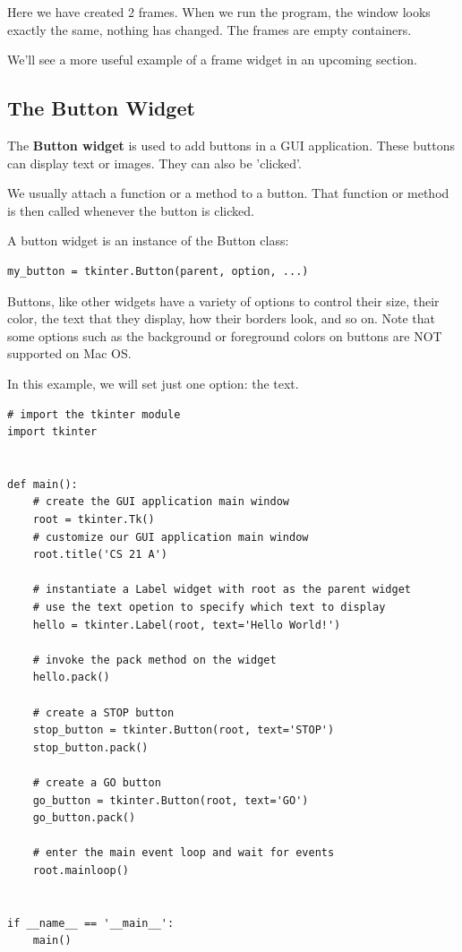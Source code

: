 \documentclass{article}
\begin{document}
Here we have created 2 frames.  When we run the program, the window looks exactly the same, nothing has changed.  The frames are empty containers.  

We'll see a more useful example of a frame widget in an upcoming section.

\subsection{The Button Widget}
The \textbf{Button widget} is used to add buttons in a GUI application. These buttons can display text or images.  They can also be 'clicked'.

We usually attach a function or a method to a button.  That function or method is then  called whenever the button is clicked.
 
A button widget is an instance of the Button class:
\begin{lstlisting}
my_button = tkinter.Button(parent, option, ...)
\end{lstlisting}

Buttons, like other widgets have a variety of options to control their size, their color, the text that they display, how their borders look, and so on.   Note that some options such as the background or foreground colors on buttons are NOT supported on Mac OS.

In this example, we will set just one option: the text.  

\begin{lstlisting}
# import the tkinter module
import tkinter


def main():
    # create the GUI application main window
    root = tkinter.Tk()
    # customize our GUI application main window
    root.title('CS 21 A')

    # instantiate a Label widget with root as the parent widget
    # use the text opetion to specify which text to display
    hello = tkinter.Label(root, text='Hello World!')

    # invoke the pack method on the widget
    hello.pack()

    # create a STOP button
    stop_button = tkinter.Button(root, text='STOP')
    stop_button.pack()

    # create a GO button
    go_button = tkinter.Button(root, text='GO')
    go_button.pack()

    # enter the main event loop and wait for events
    root.mainloop()


if __name__ == '__main__':
    main()
\end{lstlisting}
\end{document}
